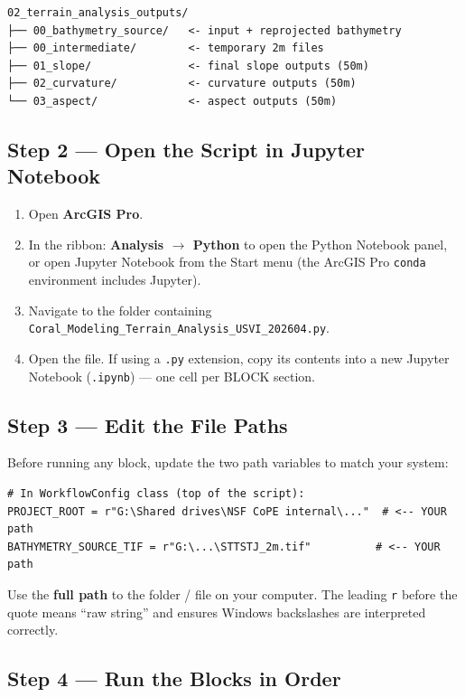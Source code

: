 \documentclass[11pt, a4paper]{article}
\begin{document}
\begin{lstlisting}[style=shell]
02_terrain_analysis_outputs/
├── 00_bathymetry_source/   <- input + reprojected bathymetry
├── 00_intermediate/        <- temporary 2m files
├── 01_slope/               <- final slope outputs (50m)
├── 02_curvature/           <- curvature outputs (50m)
└── 03_aspect/              <- aspect outputs (50m)
\end{lstlisting}

\subsection{Step 2 — Open the Script in Jupyter Notebook}

\begin{enumerate}[noitemsep]
  \item Open \textbf{ArcGIS Pro}.
  \item In the ribbon: \textbf{Analysis $\to$ Python} to open the Python Notebook panel,
        or open Jupyter Notebook from the Start menu (the ArcGIS Pro \texttt{conda}
        environment includes Jupyter).
  \item Navigate to the folder containing
        \texttt{Coral\_Modeling\_Terrain\_Analysis\_USVI\_202604.py}.
  \item Open the file.  If using a \texttt{.py} extension, copy its contents
        into a new Jupyter Notebook (\texttt{.ipynb}) — one cell per BLOCK section.
\end{enumerate}

\subsection{Step 3 — Edit the File Paths}

Before running any block, update the two path variables to match your system:

\begin{lstlisting}[style=pycode]
# In WorkflowConfig class (top of the script):
PROJECT_ROOT = r"G:\Shared drives\NSF CoPE internal\..."  # <-- YOUR path
BATHYMETRY_SOURCE_TIF = r"G:\...\STTSTJ_2m.tif"          # <-- YOUR path
\end{lstlisting}

Use the \textbf{full path} to the folder / file on your computer.
The leading \texttt{r} before the quote means ``raw string'' and ensures
Windows backslashes are interpreted correctly.

\subsection{Step 4 — Run the Blocks in Order}
\end{document}
